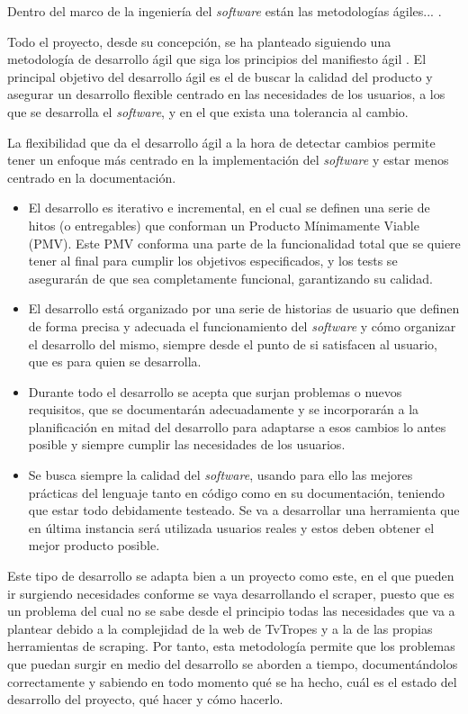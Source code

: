 Dentro del marco de la ingeniería del \textit{software} están las metodologías ágiles... \cite{abrahamsson2017agile}.

Todo el proyecto, desde su concepción, se ha planteado siguiendo una metodología de desarrollo ágil que siga los principios del manifiesto ágil \cite{agilemanifesto}. El principal objetivo del desarrollo ágil es el de buscar la calidad del producto y asegurar un desarrollo flexible centrado en las necesidades de los usuarios, a los que se desarrolla el \textit{software}, y en el que exista una tolerancia al cambio.

La flexibilidad que da el desarrollo ágil a la hora de detectar cambios permite tener un enfoque más centrado en la implementación del \textit{software} y estar menos centrado en la documentación.

\begin{itemize}
    \item El desarrollo es iterativo e incremental, en el cual se definen una serie de hitos (o entregables) que conforman un Producto Mínimamente Viable (PMV). Este PMV conforma una parte de la funcionalidad total que se quiere tener al final para cumplir los objetivos especificados, y los tests se asegurarán de que sea completamente funcional, garantizando su calidad.
    \item El desarrollo está organizado por una serie de historias de usuario que definen de forma precisa y adecuada el funcionamiento del \textit{software} y cómo organizar el desarrollo del mismo, siempre desde el punto de si satisfacen al usuario, que es para quien se desarrolla.
    \item Durante todo el desarrollo se acepta que surjan problemas o nuevos requisitos, que se documentarán adecuadamente y se incorporarán a la planificación en mitad del desarrollo para adaptarse a esos cambios lo antes posible y siempre cumplir las necesidades de los usuarios.
    \item Se busca siempre la calidad del \textit{software}, usando para ello las mejores prácticas del lenguaje tanto en código como en su documentación, teniendo que estar todo debidamente testeado. Se va a desarrollar una herramienta que en última instancia será utilizada usuarios reales y estos deben obtener el mejor producto posible.
\end{itemize}

Este tipo de desarrollo se adapta bien a un proyecto como este, en el que pueden ir surgiendo necesidades conforme se vaya desarrollando el scraper, puesto que es un problema del cual no se sabe desde el principio todas las necesidades que va a plantear debido a la complejidad de la web de TvTropes y a la de las propias herramientas de scraping. Por tanto, esta metodología permite que los problemas que puedan surgir en medio del desarrollo se aborden a tiempo, documentándolos correctamente y sabiendo en todo momento qué se ha hecho, cuál es el estado del desarrollo del proyecto, qué hacer y cómo hacerlo.

